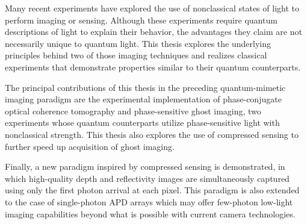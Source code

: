 Many recent experiments have explored the use of nonclassical states 
of light to perform imaging or sensing. Although these experiments
require quantum descriptions of light to explain their behavior, the advantages they
claim are not necessarily unique to quantum light. This thesis
explores the underlying principles behind two of those imaging techniques and
realizes classical experiments that demonstrate properties similar to
their quantum counterparts.

The principal contributions of this thesis in the preceding quantum-mimetic imaging paradigm
are the experimental implementation of phase-conjugate optical
coherence tomography and phase-sensitive ghost imaging, two
experiments whose quantum counterparts utilize phase-sensitive light with nonclassical strength.
This thesis also explores the use of compressed sensing to further
speed up acquisition of ghost imaging.

Finally, a new paradigm inspired by compressed sensing is
demonstrated, in which high-quality depth and reflectivity images are
simultaneously captured using only the first photon arrival at each
pixel. This paradigm is also extended to the case of single-photon APD
arrays which may offer few-photon low-light imaging capabilities
beyond what is possible with current camera technologies.
